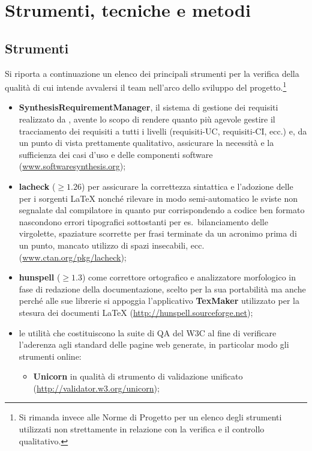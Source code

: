 \section{Strumenti, tecniche e metodi}

\subsection{Strumenti}\label{sec:tools}
Si riporta a continuazione un elenco dei principali strumenti per la verifica della qualità di cui intende avvalersi il team nell'arco dello sviluppo del progetto.\footnote{Si rimanda invece alle Norme di Progetto per un elenco degli strumenti utilizzati non strettamente in relazione con la verifica e il controllo qualitativo.}
\begin{itemize}
  \item \textbf{SynthesisRequirementManager}, il sistema di gestione dei requisiti realizzato da \team, avente lo scopo di rendere quanto più agevole gestire il tracciamento dei requisiti a tutti i livelli (requisiti-UC, requisiti-CI, ecc.) e, da un punto di vista prettamente qualitativo, assicurare la necessità e la sufficienza dei casi d'uso e delle componenti software (\url{www.softwaresynthesis.org});
 \item \textbf{lacheck} ($\geq 1.26$) per assicurare la correttezza sintattica e l'adozione delle  per i sorgenti \LaTeX{} nonché rilevare in modo semi-automatico le sviste non segnalate dal compilatore in quanto pur corrispondendo a codice ben formato nascondono errori tipografici sottostanti per es.~bilanciamento delle virgolette, spaziature scorrette per frasi terminate da un acronimo prima di un punto, mancato utilizzo di spazi insecabili, ecc. (\url{www.ctan.org/pkg/lacheck});
 \item \textbf{hunspell} ($\geq 1.3$) come correttore ortografico e analizzatore morfologico in fase di redazione della documentazione, scelto per la sua portabilità ma anche  perché alle sue librerie si appoggia l'applicativo \textbf{TexMaker} utilizzato per la stesura dei documenti \LaTeX{} (\url{http://hunspell.sourceforge.net});
 \item le utilità che costituiscono la suite di QA del W3C al fine di verificare l'aderenza agli standard delle pagine web generate, in particolar modo gli strumenti online:
 \begin{itemize}
   \item \textbf{Unicorn} in qualità di strumento di validazione unificato (\url{http://validator.w3.org/unicorn});

\end{itemize}
\end{itemize}
